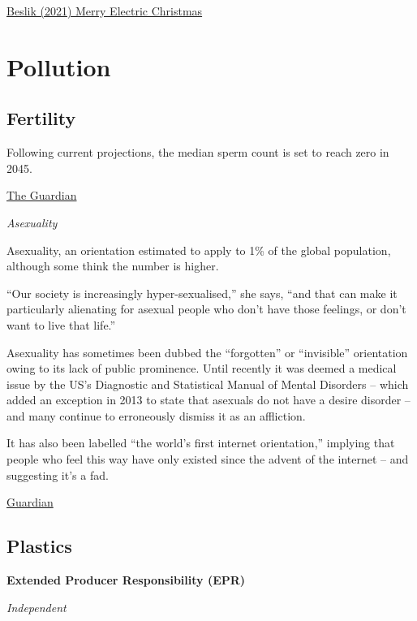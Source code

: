 \documentclass[
]{book}
\begin{document}
\href{https://esgonasunday.substack.com/p/week-51-merry-electric-christmas}{Beslik (2021) Merry Electric Christmas}

\hypertarget{pollution}{%
\chapter{Pollution}\label{pollution}}

\hypertarget{fertility}{%
\section{Fertility}\label{fertility}}

Following current projections, the median sperm count is set to reach zero in 2045.

\href{https://www.theguardian.com/us-news/2021/feb/26/falling-sperm-counts-human-survival}{The Guardian}

\emph{Asexuality}

Asexuality, an orientation estimated to apply to 1\% of the global population,
although some think the number is higher.

``Our society is increasingly hyper-sexualised,'' she says, ``and that can make it particularly alienating for asexual people who don't have those feelings, or don't want to live that life.''

Asexuality has sometimes been dubbed the ``forgotten'' or ``invisible'' orientation owing to its lack of public prominence. Until recently it was deemed a medical issue by the US's Diagnostic and Statistical Manual of Mental Disorders -- which added an exception in 2013 to state that asexuals do not have a desire disorder -- and many continue to erroneously dismiss it as an affliction.

It has also been labelled ``the world's first internet orientation,'' implying that people who feel this way have only existed since the advent of the internet -- and suggesting it's a fad.

\href{https://www.theguardian.com/lifeandstyle/2021/mar/21/i-dont-want-sex-with-anyone-the-growing-asexuality-movement}{Guardian}

\hypertarget{plastics}{%
\section{Plastics}\label{plastics}}

\textbf{Extended Producer Responsibility (EPR)}

\emph{Independent}
\end{document}
